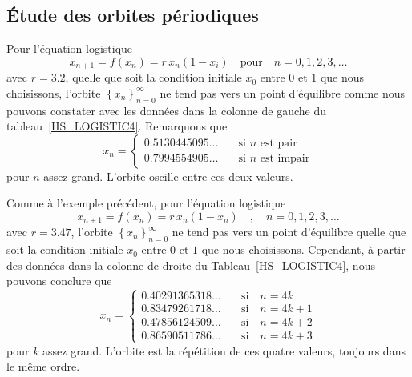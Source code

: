 {\subsection{Étude des orbites périodiques \theory}

\begin{egg}
Pour l'équation logistique
\[
x_{n+1} = f(x_n) = r\, x_n(1-x_i) \quad \text{pour} \quad n=0, 1, 2, 3, \ldots
\]
avec $r=3.2$, quelle que soit la condition initiale $x_0$ entre $0$ et
$1$ que nous choisissons, l'orbite
$\displaystyle \left\{ x_n\right\}_{n=0}^\infty$ ne tend pas vers un
point d'équilibre comme nous pouvons constater avec les données dans la
colonne de gauche du tableau~\ref{HS_LOGISTIC4}.  Remarquons que
\[
x_n =
\begin{cases}
0.5130445095\ldots &\quad \text{si $n$ est pair} \\
0.7994554905\ldots &\quad \text{si $n$ est impair}
\end{cases}
\]
pour $n$ assez grand.  L'orbite oscille entre ces deux valeurs.
\label{eggper1}
\end{egg}

\begin{egg}
Comme à l'exemple précédent, pour l'équation logistique
\[
x_{n+1} = f(x_n) = r\, x_n(1-x_n) \quad , \quad n =0, 1, 2, 3, \ldots
\]
avec $r=3.47$, l'orbite $\displaystyle \left\{ x_n\right\}_{n=0}^\infty$
ne tend pas vers un point d'équilibre quelle que soit la condition
initiale $x_0$ entre $0$ et $1$ que nous choisissons.  Cependant, à partir
des données dans la colonne de droite du Tableau~\ref{HS_LOGISTIC4},
nous pouvons conclure que
\[
x_n =
\begin{cases}
0.40291365318\ldots &\quad \text{si} \quad n=4k \\
0.83479261718\ldots &\quad \text{si} \quad n=4k+1 \\
0.47856124509\ldots &\quad \text{si} \quad n=4k+2 \\
0.86590511786\ldots &\quad \text{si} \quad n=4k+3
\end{cases}
\]
pour $k$ assez grand.  L'orbite est la répétition de ces quatre
valeurs, toujours dans le même ordre.
\label{eggper2}
\end{egg}

}
